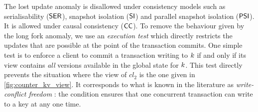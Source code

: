 The lost update anomaly is disallowed under consistency models such as
serialisability (\(\mathsf{SER}\)), snapshot isolation (\(\mathsf{SI}\)) and parallel
snapshot isolation (\(\mathsf{PSI}\)).  It is allowed under causal consistency
(\(\mathsf{CC}\)). To remove the behaviour given by the long fork anomaly, we
use an \emph{execution test} which directly restricts the updates that
are possible at the point of the transaction commits.  One simple test
is to enforce a client to commit a transaction writing to \(k\) if
and only if its view contains {\em all} versions available in the
global state for \(k\).  This test directly prevents the situation
where the view of $cl_2$ is the one given in \cref{fig:counter_kv_view}. 
It corresponds to what is known in the
literature as \emph{write-conflict freedom} \cite{framework-concur}: the condition
ensures that one concurrent transaction can write to a key at any one
time.




